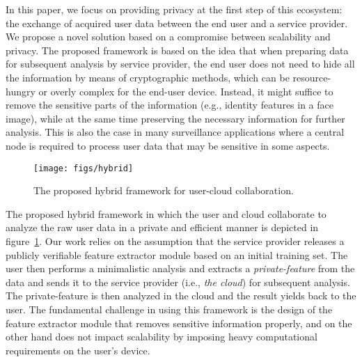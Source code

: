 \documentclass[10pt,journal,compsoc]{IEEEtran}
\begin{document}
In this paper, we focus on providing privacy at the first step of this ecosystem: the exchange of acquired user data between the end user and a service provider. We propose a novel solution based on a compromise between scalability and privacy. The proposed framework is based on the idea that when preparing data for subsequent analysis by service provider, the end user does not need to hide all the information by means of cryptographic methods, which can be resource-hungry or overly complex for the end-user device. Instead, it might suffice to remove the sensitive parts of the information (e.g., identity features in a face image), while at the same time preserving the necessary information for further analysis. This is also the case in many surveillance applications where a central node is required to process user data that may be sensitive in some aspects. 

\begin{figure}[t!]	
	\centering
	\texttt{[image: figs/hybrid]}
	\caption{The proposed hybrid framework for user-cloud collaboration.}
	\label{fig:hybrid}
\end{figure}

The proposed hybrid framework in which the user and cloud collaborate to analyze the raw user data in a private and efficient manner is depicted in figure~\ref{fig:hybrid}. Our work relies on the assumption that the service provider releases a publicly verifiable feature extractor module based on an initial training set. The user then performs a minimalistic analysis and extracts a \emph{private-feature} from the data and sends it to the service provider (i.e., \emph{the cloud}) for subsequent analysis. The private-feature is then analyzed in the cloud and the result yields back to the user. The fundamental challenge in using this framework is the design of the feature extractor module that removes sensitive information properly, and on the other hand does not impact scalability by imposing heavy computational requirements on the user's device.
\end{document}
